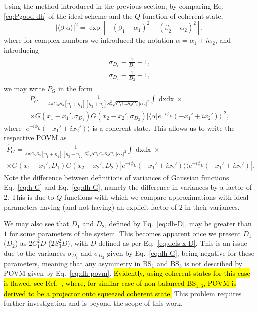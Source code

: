 Using the method introduced in the previous section, by comparing Eq.\eqref{eq:Pgood-dh} of the ideal scheme and the $Q$-function of coherent state,
\begin{equation}
    |\langle\beta|\alpha\rangle|^2=\exp\left[-
    (\beta_1-\alpha_1)^2-(\beta_2-\alpha_2)^2
    \right], %
\end{equation}
where for complex numbers we introduced the notation $\alpha=\alpha_1+i\alpha_2$, and introducing 
\begin{align}
\begin{split}
    \sigma_{D_1}\equiv\frac{1}{D_1}-1,\\
    \sigma_{D_2}\equiv\frac{1}{D_2}-1,
\end{split}
\label{eq:dh-G}
\end{align}
we may write $P_G$ in the form
\begin{multline}
    {{P}}_G=\frac{1}{4{\pi}C_3S_3[\eta_1+\eta_4][\eta_3+\eta_2]S_2^2\sqrt{ C_1C_2S_4C_4}|\alpha_L|^2} \int \mathop{dx'_1dx'_2}\times\\\times G(x_1-x_1', \sigma_{D_1})G(x_2-x_2', \sigma_{D_2})|\langle\alpha|e^{-i\phi_L}\left(-x_1'+ix_2'\right)\rangle|^2,%
\end{multline}
where $|e^{-i\phi_L}\left(-x_1'+ix_2'\right)\rangle$ is a coherent state. This allows us to write the respective POVM as
\begin{multline}
    \hat{{P}}_G=\frac{1}{4{\pi}C_3S_3[\eta_1+\eta_4][\eta_3+\eta_2]S_2^2\sqrt{C_1C_2S_4C_4}|\alpha_L|^2} \int \mathop{dx'_1dx'_2}\times\\\times G(x_1-x_1', D_1)G(x_2-x_2', D_2)|e^{-i\phi_L}\left(-x_1'+ix_2'\right)\rangle\langle e^{-i\phi_L}\left(-x_1'+ix_2'\right)|.\label{eq:dh-povm}
\end{multline}
Note the difference between definitions of variances of Gaussian functions Eq.~\eqref{eq:h-G} and Eq.~\eqref{eq:dh-G}, namely the difference in variances by a factor of $2$. This is due to $Q$-functions with which we compare approximations with ideal parameters having (and not having) an explicit factor of $2$ in their variances.

We may also see that $D_1$ and $D_2$, defined by Eq.~\eqref{eq:dh-D}, may be greater than $1$ for some parameters of the system. This becomes apparent once we present $D_1$ ($D_2$) as $2C_1^2D$ ($2S_3^2D$), with $D$ defined as per Eq.~\eqref{eq:defs-x-D}. This is an issue due to the variances $\sigma_{D_1}$ and $\sigma_{D_2}$ given by Eq.~\eqref{eq:dh-G}, being negative for these parameters, meaning that any asymmetry in BS$_1$ and BS$_3$ is not described by POVM given by Eq.~\eqref{eq:dh-povm}. \hl{Evidently, using coherent states for this case is flawed, see Ref.{~\cite{doi:10.1080/09500348714550131}}, where, for similar case of non-balanced BS$_{1,3}$, POVM is derived to be a projector onto squeezed coherent state.} This problem requires further investigation and is beyond the scope of this work.

